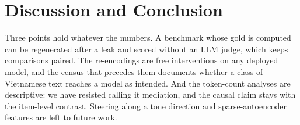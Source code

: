 \section{Discussion and Conclusion}
\label{sec:discussion}


Three points hold whatever the numbers. A benchmark whose gold is computed can be regenerated after a leak and scored without an LLM judge, which keeps comparisons paired. The re-encodings are free interventions on any deployed model, and the census that precedes them documents whether a class of Vietnamese text reaches a model as intended. And the token-count analyses are descriptive: we have resisted calling it mediation, and the causal claim stays with the item-level contrast. Steering along a tone direction and sparse-autoencoder features are left to future work.
